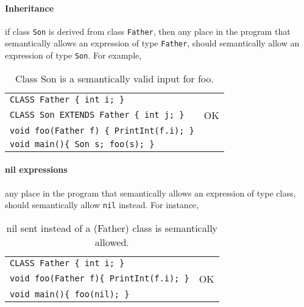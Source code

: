 \documentclass{article}
\begin{document}
\paragraph{Inheritance} if class \verb"Son" is derived from class \verb"Father",
then any place in the program that semantically allows an expression of type \verb"Father",
should semantically allow an expression of type \verb"Son".
For example,
\begin{table}[h]
\centering
\begin{tabular}{ | l  | l | }
\hline
\verb"CLASS Father { int i; }"               &    \\
\verb"CLASS Son EXTENDS Father { int j; }"   & OK \\
\verb"void foo(Father f) { PrintInt(f.i); }" &    \\
\verb"void main(){ Son s; foo(s); }"         &    \\
\hline
\end{tabular}
\caption{Class Son is a semantically valid input for foo.
\label{Table_Code_Examples_Son_Class_Instead_Of_Father_Class}}
\end{table}
\paragraph{nil expressions} any place in the program that
semantically allows an expression of type class,
should semantically allow \verb"nil" instead.
For instance,
\begin{table}[h]
\centering
\begin{tabular}{ | l | l | }
\hline
\verb"CLASS Father { int i; }"              &    \\
\verb"void foo(Father f){ PrintInt(f.i); }" & OK \\
\verb"void main(){ foo(nil); }"            &    \\
\hline
\end{tabular}
\caption{nil sent instead of a (Father) class is semantically allowed.
\label{Table_Code_Examples_nil_Instead_Of_Any_Class}}
\end{table}
\end{document}
